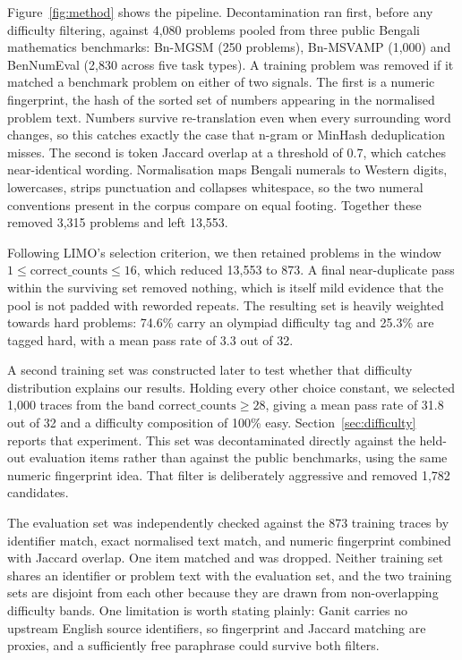 Figure~\ref{fig:method} shows the pipeline. Decontamination ran first, before
any difficulty filtering, against 4,080 problems pooled from three public
Bengali mathematics benchmarks: Bn-MGSM (250 problems), Bn-MSVAMP (1,000) and
BenNumEval (2,830 across five task types). A training problem was removed if it
matched a benchmark problem on either of two signals. The first is a numeric
fingerprint, the hash of the sorted set of numbers appearing in the normalised
problem text. Numbers survive re-translation even when every surrounding word
changes, so this catches exactly the case that n-gram or MinHash deduplication
misses. The second is token Jaccard overlap at a threshold of 0.7, which
catches near-identical wording. Normalisation maps Bengali numerals to Western
digits, lowercases, strips punctuation and collapses whitespace, so the two
numeral conventions present in the corpus compare on equal footing. Together
these removed 3,315 problems and left 13,553.

Following LIMO's selection criterion, we then retained problems in the window
$1 \leq \text{correct\_counts} \leq 16$, which reduced 13,553 to 873. A final
near-duplicate pass within the surviving set removed nothing, which is itself
mild evidence that the pool is not padded with reworded repeats. The resulting
set is heavily weighted towards hard problems: 74.6\% carry an olympiad
difficulty tag and 25.3\% are tagged hard, with a mean pass rate of 3.3 out of
32.

A second training set was constructed later to test whether that difficulty
distribution explains our results. Holding every other choice constant, we
selected 1,000 traces from the band $\text{correct\_counts} \geq 28$, giving a
mean pass rate of 31.8 out of 32 and a difficulty composition of 100\% easy.
Section~\ref{sec:difficulty} reports that experiment. This set was
decontaminated directly against the held-out evaluation items rather than
against the public benchmarks, using the same numeric fingerprint idea. That
filter is deliberately aggressive and removed 1,782 candidates.

The evaluation set was independently checked against the 873 training traces by
identifier match, exact normalised text match, and numeric fingerprint combined
with Jaccard overlap. One item matched and was dropped. Neither training set
shares an identifier or problem text with the evaluation set, and the two
training sets are disjoint from each other because they are drawn from
non-overlapping difficulty bands. One limitation is worth stating plainly:
Ganit carries no upstream English source identifiers, so fingerprint and
Jaccard matching are proxies, and a sufficiently free paraphrase could survive
both filters.


